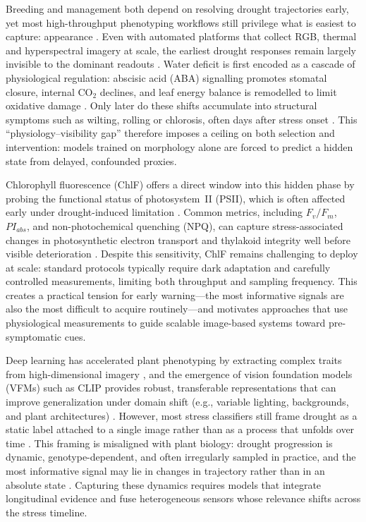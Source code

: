 \documentclass[a4paper,fleqn]{cas-dc}
\begin{document}
Breeding and management both depend on resolving drought trajectories early, yet most high-throughput phenotyping workflows still privilege what is easiest to capture: appearance \citep{heinBottlenecksOpportunitiesFieldbased2021}. Even with automated platforms that collect RGB, thermal and hyperspectral imagery at scale, the earliest drought responses remain largely invisible to the dominant readouts \citep{gerhardsChallengesFuturePerspectives2019}. Water deficit is first encoded as a cascade of physiological regulation: abscisic acid (ABA) signalling promotes stomatal closure, internal CO$_2$ declines, and leaf energy balance is remodelled to limit oxidative damage \citep{brayMolecularResponsesWater1993}. Only later do these shifts accumulate into structural symptoms such as wilting, rolling or chlorosis, often days after stress onset \citep{yangBattleCropsDrought2023}. This ``physiology--visibility gap'' therefore imposes a ceiling on both selection and intervention: models trained on morphology alone are forced to predict a hidden state from delayed, confounded proxies.

Chlorophyll fluorescence (ChlF) offers a direct window into this hidden phase by probing the functional status of photosystem~II (PSII), which is often affected early under drought-induced limitation \citep{bakerChlorophyllFluorescenceProbe2008, murchieChlorophyllFluorescenceAnalysis2013}. Common metrics, including $F_v/F_m$, $PI_{abs}$, and non-photochemical quenching (NPQ), can capture stress-associated changes in photosynthetic electron transport and thylakoid integrity well before visible deterioration \citep{liTrackingChlorophyllFluorescence2019, javornikMonitoringDroughtStress2023}. Despite this sensitivity, ChlF remains challenging to deploy at scale: standard protocols typically require dark adaptation and carefully controlled measurements, limiting both throughput and sampling frequency. This creates a practical tension for early warning---the most informative signals are also the most difficult to acquire routinely---and motivates approaches that use physiological measurements to guide scalable image-based systems toward pre-symptomatic cues.

Deep learning has accelerated plant phenotyping by extracting complex traits from high-dimensional imagery \citep{singhMachineLearningHighThroughput2016}, and the emergence of vision foundation models (VFMs) such as CLIP \citep{radfordLearningTransferableVisual2021} provides robust, transferable representations that can improve generalization under domain shift (e.g., variable lighting, backgrounds, and plant architectures) \citep{liCLIPPoweredDomainGeneralization2026}. However, most stress classifiers still frame drought as a static label attached to a single image rather than as a process that unfolds over time \citep{shenConstructionDroughtMonitoring2019}. This framing is misaligned with plant biology: drought progression is dynamic, genotype-dependent, and often irregularly sampled in practice, and the most informative signal may lie in changes in trajectory rather than in an absolute state \citep{tardieuPhysiologicalBasisDrought2018}. Capturing these dynamics requires models that integrate longitudinal evidence and fuse heterogeneous sensors whose relevance shifts across the stress timeline.
\end{document}
